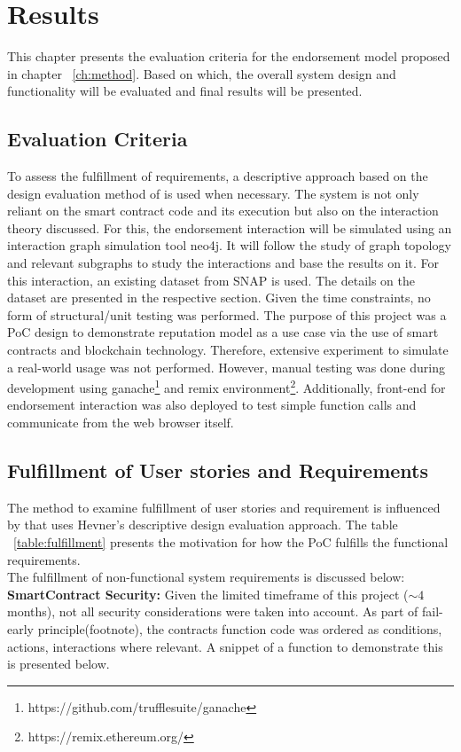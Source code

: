 \chapter{Results} \label{ch:results}
This chapter presents the evaluation criteria for the endorsement model
proposed in chapter ~\ref{ch:method}. Based on which, the overall system design
and functionality will be evaluated and final results will be presented. 

\section{Evaluation Criteria}
To assess the fulfillment of requirements, a descriptive approach
based on the design evaluation method of \cite{hevner2010design} is used when
necessary. The system is not only reliant on the smart contract code and its
execution but also on the interaction theory discussed. For this, the
endorsement interaction will be simulated using an interaction graph simulation
tool neo4j. It will follow the study of graph topology and relevant subgraphs
to study the interactions and base the results on it. For this interaction, an
existing dataset from SNAP\cite{snapnets} is used. The details on the dataset
are presented in the respective section.  Given the time constraints, no form
of structural/unit testing was performed. The purpose of this project was a PoC
design to demonstrate reputation model as a use case via the use of smart
contracts and blockchain technology. Therefore, extensive experiment to
simulate a real-world usage was not performed. However, manual testing was done
during development using
ganache\footnote{https://github.com/trufflesuite/ganache} and remix
environment\footnote{https://remix.ethereum.org/}. Additionally, front-end for
endorsement interaction was also deployed to test simple function calls and
communicate from the web browser itself. 

\section{Fulfillment of User stories and Requirements}
The method to examine fulfillment of user stories and requirement is influenced
by \cite{Bergquist1107612} that uses Hevner's descriptive design evaluation
approach\cite{hevner2010design}. The table ~\ref{table:fulfillment} presents
the motivation for how the PoC fulfills the functional requirements.\\ 

The fulfillment of non-functional system requirements is discussed below:\\
\textbf{SmartContract Security:} Given the limited timeframe of this project
($\sim{4}$ months), not all security considerations were taken into account. As
part of fail-early principle(footnote), the contracts function code was ordered
as conditions, actions, interactions where relevant. A snippet of a function to
demonstrate this is presented below. 

